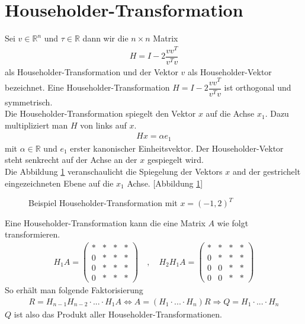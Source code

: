 \section{Householder-Transformation}
Sei $v \in \mathbb{R}^n$ und $\tau \in \mathbb{R}$ dann wir die $n \times n$ Matrix 
\begin{align}
	H = I - 2 \dfrac{vv^T}{v^Tv}
\end{align}
als Householder-Transformation und der Vektor $v$ als Householder-Vektor bezeichnet.
Eine Householder-Transformation $H = I - 2 \dfrac{vv^T}{v^Tv}$ ist orthogonal und symmetrisch. \cite{num1}\\
Die Householder-Transformation spiegelt den Vektor $x$ auf die Achse $x_1$.
Dazu multipliziert man $H$ von links auf $x$.
\begin{align}
	Hx=\alpha e_1 \label{spiegelung}
\end{align}
mit $\alpha \in \mathbb{R}$ und $e_1$ erster kanonischer Einheitsvektor. Der Householder-Vektor steht senkrecht auf der Achse an der $x$ gespiegelt wird.\\
Die Abbildung \ref{fig:HHolder} veranschaulicht die Spiegelung der Vektors $x$ and der gestrichelt eingezeichneten Ebene auf die $x_1$ Achse.
[Abbildung \ref{fig:HHolder}]
\begin{figure}[h]
	\centering
	
	\caption{Beispiel Householder-Transformation mit $x=(-1,2)^T$}
	\label{fig:HHolder}
\end{figure}

Eine Householder-Transformation kann die eine Matrix $A$ wie folgt transformieren.
\begin{align*}
	H_1 A= \left( 
	\begin{array}{cccc}
	* & * & * & * \\ 
	0 & * & * & * \\ 
	0 & * & * & * \\ 
	0 & * & * & *
	\end{array}
	\right)
	\quad , \quad
	H_2 H_1 A= \left( 
	\begin{array}{cccc}
	* & * & * & * \\ 
	0 & * & * & * \\ 
	0 & 0 & * & * \\ 
	0 & 0 & * & *
	\end{array}
	\right)
\end{align*} 
So erhält man folgende Faktorisierung
\begin{align*}
	R = H_{n-1} H_{n-2}\cdot ...\cdot H_1 A \Leftrightarrow A = (H_1\cdot ...\cdot H_n)R \Rightarrow Q = H_1\cdot ... \cdot H_n
\end{align*}
$Q$ ist also das Produkt aller Householder-Transformationen.


